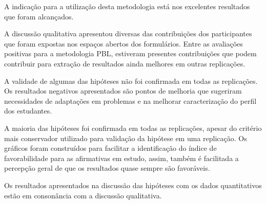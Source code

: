 A indicação para a utilização desta metodologia está
nos excelentes resultados que foram alcançados.

A discussão qualitativa apresentou diversas das contribuições
dos participantes que foram expostas nos espaços abertos dos
formulários.
Entre as avaliações positivas para a metodologia \ac{PBL},
estiveram presentes contribuições que podem contribuir para
extração de resultados ainda melhores em outras replicações.

A validade de algumas das hipóteses não foi confirmada
em todas as replicações.
Os resultados negativos apresentados são pontos de
melhoria que sugeriram necessidades de adaptações
em problemas e na melhorar caracterização do perfil
dos estudantes.

A maioria das hipóteses foi confirmada em todas as replicações,
apesar do critério mais conservador utilizado para validação da
hipótese em uma replicação.
Os gráficos foram construídos para facilitar a identificação
do índice de favorabilidade para as afirmativas em estudo, assim,
também é facilitada a percepção geral de que os resultados quase
sempre são favoráveis.

Os resultados apresentados na discussão das hipóteses com
os dados quantitativos estão em consonância com a discussão
qualitativa.
